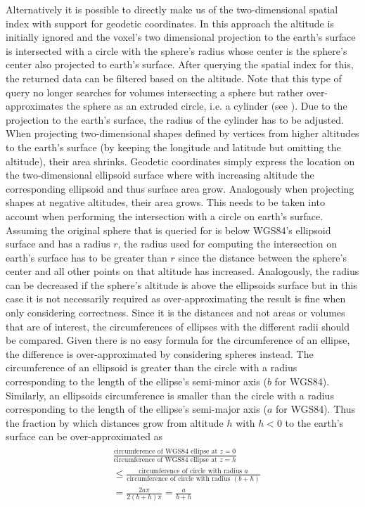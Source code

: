 \documentclass[10pt,conference,compsocconf]{IEEEtran}
\begin{document}
Alternatively it is possible to directly make us of the two-dimensional spatial index with support for geodetic coordinates.
In this approach the altitude is initially ignored and the voxel's two dimensional projection to the earth's surface is intersected with a circle with the sphere's radius whose center is the sphere's center also projected to earth's surface.
After querying the spatial index for this, the returned data can be filtered based on the altitude.
Note that this type of query no longer searches for volumes intersecting a sphere but rather over-approximates the sphere as an extruded circle, i.e. a cylinder (see ).
Due to the projection to the earth's surface, the radius of the cylinder has to be adjusted.
When projecting two-dimensional shapes defined by vertices from higher altitudes to the earth's surface (by keeping the longitude and latitude but omitting the altitude), their area shrinks.
Geodetic coordinates simply express the location on the two-dimensional ellipsoid surface where with increasing altitude the corresponding ellipsoid and thus surface area grow.
Analogously when projecting shapes at negative altitudes, their area grows.
This needs to be taken into account when performing the intersection with a circle on earth's surface.
Assuming the original sphere that is queried for is below WGS84's ellipsoid surface and has a radius $r$, the radius used for computing the intersection on earth's surface has to be greater than $r$ since the distance between the sphere's center and all other points on that altitude has increased.
Analogously, the radius can be decreased if the sphere's altitude is above the ellipsoids surface but in this case it is not necessarily required as over-approximating the result is fine when only considering correctness.
Since it is the distances and not areas or volumes that are of interest, the circumferences of ellipses with the different radii should be compared.
Given there is no easy formula for the circumference of an ellipse, the difference is over-approximated by considering spheres instead.
The circumference of an ellipsoid is greater than the circle with a radius corresponding to the length of the ellipse's semi-minor axis ($b$ for WGS84).
Similarly, an ellipsoids circumference is smaller than the circle with a radius corresponding to the length of the ellipse's semi-major axis ($a$ for WGS84).
Thus the fraction by which distances grow from altitude $h$ with $h < 0$ to the earth's surface can be over-approximated as
\begin{align}
\begin{split}
	&\frac{\text{circumference of WGS84 ellipse at }z=0}{\text{circumference of WGS84 ellipse at }z=h}\\
	&\leq \frac{\text{circumference of circle with radius } a}{\text{circumference of circle with radius } (b+h)}\\
	&= \frac{2 a \pi}{2 (b+h) \pi} = \frac{a}{b+h}\\
	&\\
\end{split}
\end{align}
\end{document}
